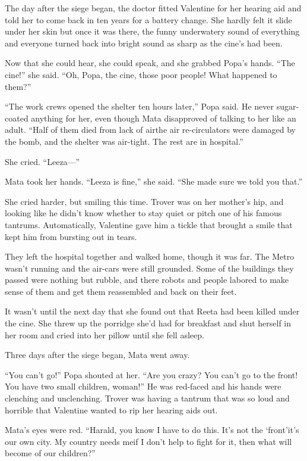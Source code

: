 \tb

The day after the siege began, the doctor fitted Valentine for her
hearing aid and told her to come back in ten years for a battery
change. She hardly felt it slide under her skin but once it was
there, the funny underwatery sound of everything and everyone
turned back into bright sound as sharp as the cine’s had been.

Now that she could hear, she could speak, and she grabbed Popa’s
hands. “The cine!” she said. “Oh, Popa, the cine, those poor
people! What happened to them?”

“The work crews opened the shelter ten hours later,” Popa said. He
never sugar-coated anything for her, even though Mata disapproved
of talking to her like an adult. “Half of them died from lack of
air\dash{}the air re-circulators were damaged by the bomb, and the
shelter was air-tight. The rest are in hospital.”

She cried. “Leeza---”

Mata took her hands. “Leeza is fine,” she said. “She made sure we
told you that.”

She cried harder, but smiling this time. Trover was on her mother’s
hip, and looking like he didn’t know whether to stay quiet or pitch
one of his famous tantrums. Automatically, Valentine gave him a
tickle that brought a smile that kept him from bursting out in
tears.

They left the hospital together and walked home, though it was far.
The Metro wasn’t running and the air-cars were still grounded. Some
of the buildings they passed were nothing but rubble, and there
robots and people labored to make sense of them and get them
reassembled and back on their feet.

It wasn’t until the next day that she found out that Reeta had been
killed under the cine. She threw up the porridge she’d had for
breakfast and shut herself in her room and cried into her pillow
until she fell asleep.

\tb

Three days after the siege began, Mata went away.

“You can’t go!” Popa shouted at her. “Are you crazy? You can’t go
to the front! You have two small children, woman!” He was red-faced
and his hands were clenching and unclenching. Trover was having a
tantrum that was so loud and horrible that Valentine wanted to rip
her hearing aids out.

Mata’s eyes were red. “Harald, you know I have to do this. It’s not
the ‘front’\dash{}it’s our own city. My country needs me\dash{}if I don’t help
to fight for it, then what will become of our children?”

